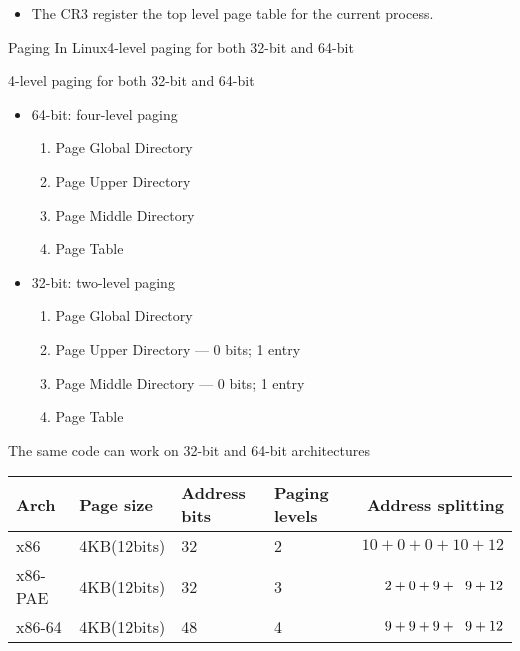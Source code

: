 \begin{itemize}
\item The CR3 register {\pright} the top level page table for the current process.
\end{itemize}

\begin{frame}{Paging In Linux}{4-level paging for both 32-bit and 64-bit}
  \centering
  \mode<beamer>{ \texttt{[image: 4-level-paging]} }%
\end{frame}

\begin{frame}%
  \begin{block}{4-level paging for both 32-bit and 64-bit}
    \begin{itemize}
    \item \alert{64-bit: four-level paging}
      \begin{enumerate}
      \item Page Global Directory
      \item Page Upper Directory
      \item Page Middle Directory
      \item Page Table
      \end{enumerate}
    \item \alert{32-bit: two-level paging}
      \begin{enumerate}
      \item Page Global Directory
      \item Page Upper Directory --- 0 bits; 1 entry
      \item Page Middle Directory --- 0 bits; 1 entry
      \item Page Table
      \end{enumerate}
    \end{itemize}
    \alert{The same code can work on 32-bit and 64-bit architectures}
  \end{block}
    \begin{center}
    \begin{scriptsize}
      \begin{tabular}{llm{3em}m{3em}r}
        \hline
        Arch&Page size&Address bits&Paging levels&Address splitting\\\hline
        x86 &4KB(12bits) &32 &2 &$10+0+0+10+12$\\
        x86-PAE&4KB(12bits)&32&3&$2+0+9+\hspace{.6em}9+12$\\
        x86-64&4KB(12bits)&48&4&$9+9+9+\hspace{.6em}9+12$\\\hline
      \end{tabular}
    \end{scriptsize}
  \end{center}
\end{frame}


